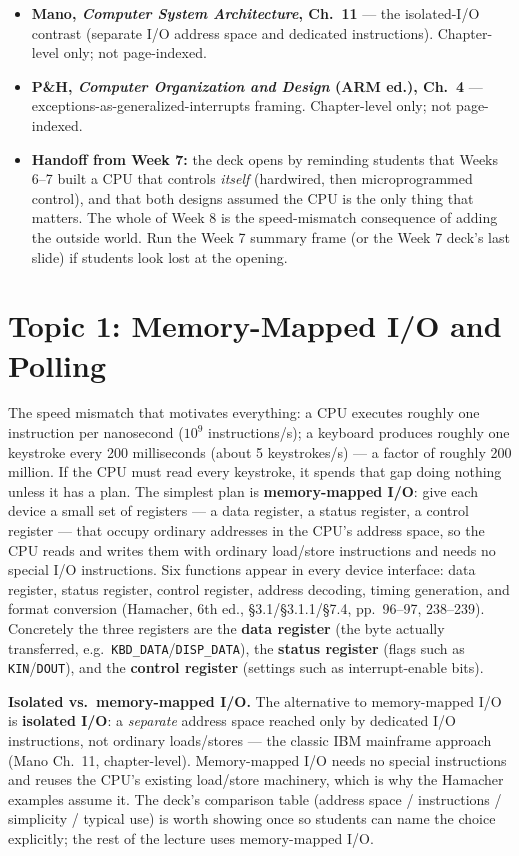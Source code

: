 \documentclass[11pt]{article}
\begin{document}
\begin{sloppypar}
\begin{itemize}
  \item \textbf{Mano, \textit{Computer System Architecture}, Ch.~11} --- the isolated-I/O contrast (separate I/O address space and dedicated instructions). Chapter-level only; not page-indexed.
  \item \textbf{P\&H, \textit{Computer Organization and Design} (ARM ed.), Ch.~4} --- exceptions-as-generalized-interrupts framing. Chapter-level only; not page-indexed.
  \item \textbf{Handoff from Week 7:} the deck opens by reminding students that Weeks 6--7 built a CPU that controls \emph{itself} (hardwired, then microprogrammed control), and that both designs assumed the CPU is the only thing that matters. The whole of Week 8 is the speed-mismatch consequence of adding the outside world. Run the Week 7 summary frame (or the Week 7 deck's last slide) if students look lost at the opening.
\end{itemize}
\end{sloppypar}

\section{Topic 1: Memory-Mapped I/O and Polling}

The speed mismatch that motivates everything: a CPU executes roughly one instruction per nanosecond ($10^9$ instructions/s); a keyboard produces roughly one keystroke every 200 milliseconds (about 5 keystrokes/s) --- a factor of roughly 200 million. If the CPU must read every keystroke, it spends that gap doing nothing unless it has a plan. The simplest plan is \textbf{memory-mapped I/O}: give each device a small set of registers --- a data register, a status register, a control register --- that occupy ordinary addresses in the CPU's address space, so the CPU reads and writes them with ordinary load/store instructions and needs no special I/O instructions. Six functions appear in every device interface: data register, status register, control register, address decoding, timing generation, and format conversion (Hamacher, 6th ed., \S3.1/\S3.1.1/\S7.4, pp.~96--97, 238--239). Concretely the three registers are the \textbf{data register} (the byte actually transferred, e.g.\ \texttt{KBD\_DATA}/\texttt{DISP\_DATA}), the \textbf{status register} (flags such as \texttt{KIN}/\texttt{DOUT}), and the \textbf{control register} (settings such as interrupt-enable bits).

\vspace{0.3em}
\noindent\textbf{Isolated vs.\ memory-mapped I/O.} The alternative to memory-mapped I/O is \textbf{isolated I/O}: a \emph{separate} address space reached only by dedicated I/O instructions, not ordinary loads/stores --- the classic IBM mainframe approach (Mano Ch.~11, chapter-level). Memory-mapped I/O needs no special instructions and reuses the CPU's existing load/store machinery, which is why the Hamacher examples assume it. The deck's comparison table (address space / instructions / simplicity / typical use) is worth showing once so students can name the choice explicitly; the rest of the lecture uses memory-mapped I/O.
\end{document}
